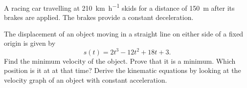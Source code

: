 \begin{questions}
  \questioA A racing car travelling at \SI{210}{\kilo\metre\per\hour} skids for a distance of \SI{150}{\metre}
            after its brakes are applied. The brakes provide a constant deceleration.
  \questioE The displacement of an object moving in a straight line on either side of a fixed origin is given by
            \begin{displaymath}
              s(t) = 2t^3 - 12t^2 + 18t + 3.
            \end{displaymath}
            Find the minimum velocity of the object. Prove that it is a minimum. Which position is it at at that time?
  \questioM Derive the kinematic equations by looking at the velocity graph of an object with constant acceleration.
\end{questions}

